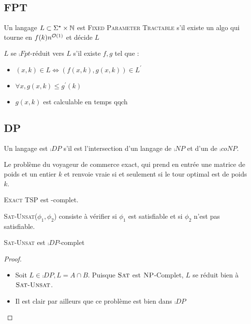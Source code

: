 \documentclass{cours}
\begin{document}
\subsection{FPT}
\begin{definition}
    Un langage $L \subset \Sigma^{\star} \times \mathbb{N}$ est \textsc{Fixed Parameter Tractable} s'il existe un algo qui tourne en $f(k)n^{\mathcal{O}(1)}$ et décide $L$
\end{definition}

\begin{definition}
    $L$ se $\comp{Fpt}$-réduit vers $L$ s'il existe $f, g$ tel que : 
    \begin{itemize}
        \item $(x, k) \in L \Leftrightarrow \left(f(x, k), g(x, k)\right) \in L^{'}$
        \item $\forall x, g(x, k) \leq g^{'}(k)$
        \item $g(x, k)$ est calculable en temps qqch
    \end{itemize}
\end{definition}

\subsection{DP}
\begin{definition}
    Un langage est $\comp{DP}$ s'il est l'intersection d'un langage de $\comp{NP}$ et d'un de $\comp{coNP}$.
\end{definition}

\begin{definition}
    Le problème du voyageur de commerce exact, qui prend en entrée une matrice de poids et un entier $k$ et renvoie vraie si et seulement si le tour optimal est de poids $k$. 
\end{definition}

\begin{proposition}
    \textsc{Exact TSP} est -complet. 
\end{proposition}

\begin{definition}
    \textsc{Sat-Unsat}($\phi_{1}, \phi_{2}$) consiste à vérifier si $\phi_{1}$ est satisfiable et si $\phi_{2}$ n'est pas satisfiable. 
\end{definition}

\begin{proposition}
    \textsc{Sat-Unsat} est $\comp{DP}$-complet
\end{proposition}
\begin{proof}
    \begin{itemize}
        \item Soit $L \in \comp{DP}, L = A\cap B$. Puisque $\textsc{Sat}$ est $\textsc{NP}$-Complet, $L$ se réduit bien à $\textsc{Sat-Unsat}$. 
        \item Il est clair par ailleurs que ce problème est bien dans $\comp{DP}$
    \end{itemize}
\end{proof}
\end{document}
